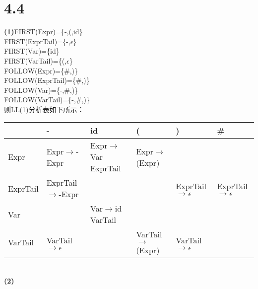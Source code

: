 \documentclass{article}
\begin{document}
\section*{4.4}
\noindent 
\textbf{(1)}FIRST(Expr)=\{-,(,id\}\\
FIRST(ExprTail)=\{-,$\epsilon$\}\\
FIRST(Var)=\{id\}\\
FIRST(VarTail)=\{(,$\epsilon$\}\\
FOLLOW(Expr)=\{\#,)\}\\
FOLLOW(ExprTail)=\{\#,)\}\\
FOLLOW(Var)=\{-,\#,)\}\\
FOLLOW(VarTail)=\{-,\#,)\}\\
则LL(1)分析表如下所示：
\begin{table}[h]
    \centering
    \begin{tabular}{|p{2.6cm}<{\centering}|p{2.6cm}<{\centering}|p{2.6cm}<{\centering}|p{2.6cm}<{\centering}|p{2.6cm}<{\centering}|p{2.6cm}<{\centering}|}
        \hline
        & - & id & ( & ) & \# \\
        \hline
        Expr& Expr$\rightarrow$-Expr & Expr$\rightarrow$Var ExprTail & Expr$\rightarrow$(Expr) && \\
        \hline
        ExprTail & ExprTail$\rightarrow$-Expr &&& ExprTail$\rightarrow\epsilon$ & ExprTail$\rightarrow\epsilon$ \\
        \hline
        Var && Var$\rightarrow$id VarTail &&& \\
        \hline
        VarTail & VarTail$\rightarrow\epsilon$ && VarTail$\rightarrow$(Expr) & VarTail$\rightarrow\epsilon$ & \\
        \hline
    \end{tabular}
\end{table}
\\
\textbf{(2)}
\end{document}
